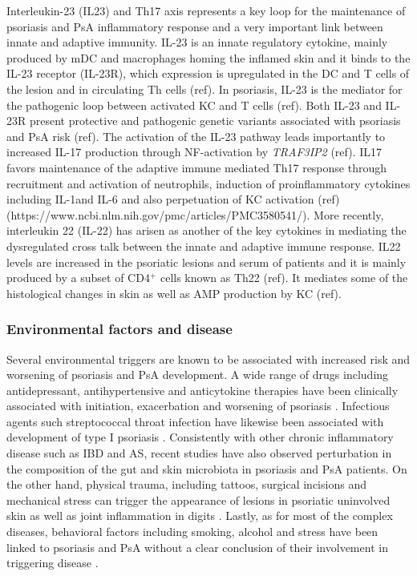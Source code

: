 Interleukin-23 (IL23) and Th17 axis represents a key loop for the maintenance of psoriasis and PsA inflammatory response and a very important link between innate and adaptive immunity. IL-23 is an innate regulatory cytokine, mainly produced by mDC and macrophages homing the inflamed skin and it binds to the IL-23 receptor (IL-23R), which expression is upregulated in the DC and T cells of the lesion and in circulating Th cells (ref). In psoriasis, IL-23 is the mediator for the pathogenic loop between activated KC and T cells (ref). Both IL-23 and IL-23R present protective and pathogenic genetic variants associated with psoriasis and PsA risk (ref). The activation of the IL-23 pathway leads importantly to increased IL-17 production through NF-\kappaB activation by \textit{TRAF3IP2} (ref). IL17 favors maintenance of the adaptive immune mediated Th17 response through recruitment and activation of neutrophils, induction of proinflammatory cytokines including IL-1\beta and IL-6 and also perpetuation of KC activation (ref) (https://www.ncbi.nlm.nih.gov/pmc/articles/PMC3580541/). %
More recently, interleukin 22 (IL-22) has arisen as another of the key cytokines in mediating the dysregulated cross talk between the innate and adaptive immune response. IL22 levels are increased in the psoriatic lesions and serum of patients and it is mainly produced by a subset of CD4$^+$ cells known as Th22 (ref). It mediates some of the histological changes in skin as well as AMP production by KC (ref).


\subsubsection*{Environmental factors and disease}

Several environmental triggers are known to be associated with increased risk and worsening of psoriasis and PsA development. A wide range of drugs including antidepressant, antihypertensive and anticytokine therapies have been clinically associated with initiation, exacerbation and worsening of psoriasis \parencite{Kim2010}. Infectious agents such streptococcal throat infection have likewise been associated with development of type I psoriasis \parencite{Gudjonsson2003,Valdimarsson2009, Diluvio2006}. Consistently with other chronic inflammatory disease such as IBD and AS, recent studies have also observed perturbation in the composition of the gut and skin microbiota in psoriasis and PsA patients. On the other hand, physical trauma, including tattoos, surgical incisions and mechanical stress can trigger the appearance of lesions in psoriatic uninvolved skin as well as joint inflammation in digits \parencite {Weiss2002,Nestle2009}. Lastly, as for most of the complex diseases, behavioral factors including smoking, alcohol and stress have been linked to psoriasis and PsA without a clear conclusion of their involvement in triggering disease \parencite{Meglio2014}.

